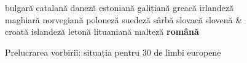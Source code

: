 \begin{figure}[tb]
\begin{tabular}
bulgară \newline 
catalană \newline 
daneză \newline 
estoniană \newline 
galițiană\newline 
greacă \newline 
irlandeză \newline 
maghiară \newline
norvegiană \newline 
poloneză \newline 
suedeză \newline
sârbă \newline 
slovacă \newline 
slovenă \newline 
& \vspace*{0.5mm} 
croată \newline 
islandeză\newline 
letonă \newline 
lituaniană \newline 
malteză \newline 
\textbf{română}\\
\end{tabular}
\caption{Prelucrarea vorbirii: situația pentru 30 de limbi europene}
\label{fig:speech_cluster_de}
\end{figure}

